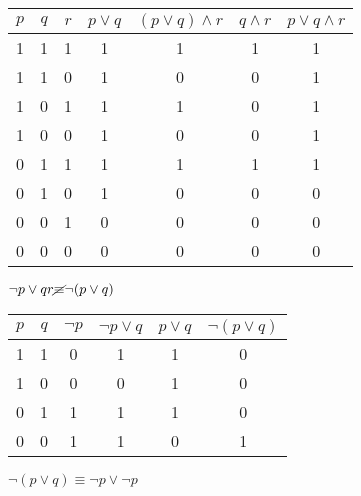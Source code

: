 \documentclass[12pt]{article}
\begin{document}
\begin{tabular}{|c|c|c|c|c|c|c|}
	\hline
	\rowcolor{lightblue!50}
	\hline
	$p$ & $q$ & $r$ & $p\vee q$ & $(p\vee q)\wedge r$ & $q\wedge r$ & $p\vee q\wedge r$ \\ \hline
	1   & 1   & 1   & 1         & 1                   & 1           & 1                 \\ \hline
	1   & 1   & 0   & 1         & 0                   & 0           & 1                 \\ \hline
	1   & 0   & 1   & 1         & 1                   & 0           & 1                 \\ \hline
	1   & 0   & 0   & 1         & 0                   & 0           & 1                 \\ \hline
	0   & 1   & 1   & 1         & 1                   & 1           & 1                 \\ \hline
	0   & 1   & 0   & 1         & 0                   & 0           & 0                 \\ \hline
	0   & 0   & 1   & 0         & 0                   & 0           & 0                 \\ \hline
	0   & 0   & 0   & 0         & 0                   & 0           & 0                 \\ \hline
\end{tabular}

{\color{lightblue}$\neg p\vee q r\renewcommand{\CancelColor}{\color{black}}\cancel{\equiv}\neg(p\vee q)$}

\begin{tabular}{|c|c|c|c|c|c|}
	\hline
	\rowcolor{lightblue!50}
	\hline
	$p$ & $q$ & $\neg p$ & $\neg p\vee q$ & $p\vee q$ & $\neg (p\vee q)$ \\ \hline
	1   & 1   & 0        & 1              & 1         & 0                \\ \hline
	1   & 0   & 0        & 0              & 1         & 0                \\ \hline
	0   & 1   & 1        & 1              & 1         & 0                \\ \hline
	0   & 0   & 1        & 1              & 0         & 1                \\ \hline
\end{tabular}
\pagebreak

{\color{lightblue}$\neg(p\vee q)\equiv\neg p\vee\neg p$}
\end{document}
